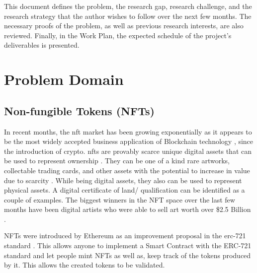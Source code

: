 \documentclass[a4paper, 12pt, oneside]{report}
\begin{document}
This document defines the problem, the research gap, research challenge, and the research strategy that the author wishes to follow over the next few months. The necessary proofs of the problem, as well as previous research interests, are also reviewed. Finally, in the Work Plan, the expected schedule of the project's deliverables is presented.


\begingroup
\let\clearpage\relax


\chapter{Problem Domain}
\section{Non-fungible Tokens (NFTs)}
In recent months, the \Gls{nft} market has been growing exponentially as it appears to be the most widely accepted business application of Blockchain technology \autocite{dowling_is_2021}, since the introduction of crypto.
\Gls{nft}s are provably scarce unique digital assets that can be used to represent ownership \autocite{noauthor_erc-721_nodate}.
They can be one of a kind rare artworks, collectable trading cards, and other assets with the potential to increase in value due to scarcity \autocite{conti_what_2021, fairfield_tokenized_2021}. While being digital assets, they also can be used to represent physical assets. A digital certificate of land/ qualification can be identified as a couple of examples. The biggest winners in the NFT space over the last few months have been digital artists who were able to sell art worth over \$2.5 Billion \parencite{noauthor_off_2021}.


NFTs were introduced by Ethereum \autocite{wood_ethereum_2014} as an improvement proposal \autocite{noauthor_eip-2309_nodate, noauthor_erc_nodate} in the \gls{erc}-721 standard \autocite{noauthor_erc-721_nodate}. This allows anyone to implement a Smart Contract with the ERC-721 standard and let people mint NFTs as well as, keep track of the tokens produced by it. This allows the created tokens to be validated.
\end{document}

